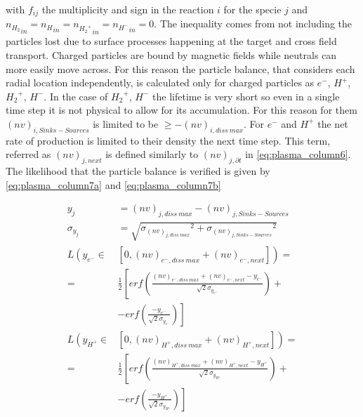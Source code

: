 with $f_{ij}$ the multiplicity and sign in the reaction $i$ for the specie $j$ and ${n_{{H_2}}}_{in}={n_{{H}}}_{in}={n_{{H_2}^+}}_{in}={n_{H^-}}_{in} =0$. The inequality comes from not including the particles lost due to surface processes happening at the target and cross field transport. Charged particles are bound by magnetic fields while neutrals can more easily move across. For this reason the particle balance, that considers each radial location independently, is calculated only for charged particles as $e^-$, $H^+$, ${H_2}^+$, $H^-$.
In the case of ${H_2}^+$, $H^-$ the lifetime is very short so even in a single time step it is not physical to allow for its accumulation. For this reason for them $(nv)_{i, Sinks-Sources}$ is limited to be $\geq -(nv)_{i, diss \: max}$. For $e^-$ and $H^+$ the net rate of production is limited to their density the next time step. This term, referred as $(nv)_{j,next}$ is defined similarly to $(nv)_{j,\partial t}$ in \autoref{eq:plasma_column6}. The likelihood that the particle balance is verified is given by \autoref{eq:plasma_column7a} and \ref{eq:plasma_column7b}

\begin{equation}
\label{eq:plasma_column7a}
\begin{aligned}
y_j &= (nv)_{j, diss \: max} - (nv)_{j, Sinks-Sources} \\ {\sigma}_{y_j} &=\sqrt{{{\sigma}_{(nv)_{j, diss \: max}}}^2 + {{\sigma}_{(nv)_{j, Sinks-Sources}}}^2 }
\\
L\left(y_{e^-{}} \in \right. & \left. [0,(nv)_{e^-, diss \: max}+(nv)_{e^-, next}]\right) =\\=& \frac{1}{2} \left[ erf \left(\frac{(nv)_{e^-, diss \: max}+(nv)_{e^-, next}-y_{e^-}}{\sqrt{2} {\sigma}_{y_{e^-}} } \right) \right. +\\ &-\left. erf \left( \frac{-y_{e^-{}}}{\sqrt{2} {\sigma}_{y_{e^-{}}} } \right) \right]
\\
L\left(y_{H^+{}} \in \right. & \left. [0,(nv)_{H^+{}, diss \: max}+(nv)_{H^+{}, next}]\right) =\\=& \frac{1}{2} \left[ erf \left(\frac{(nv)_{H^+{}, diss \: max}+(nv)_{H^+{}, next}-y_{H^+{}}}{\sqrt{2} {\sigma}_{y_{H^+{}}} } \right) \right. +\\ &-\left. erf \left( \frac{-y_{H^+{}}}{\sqrt{2} {\sigma}_{y_{H^+{}}} } \right) \right]
\end{aligned}
\end{equation}

